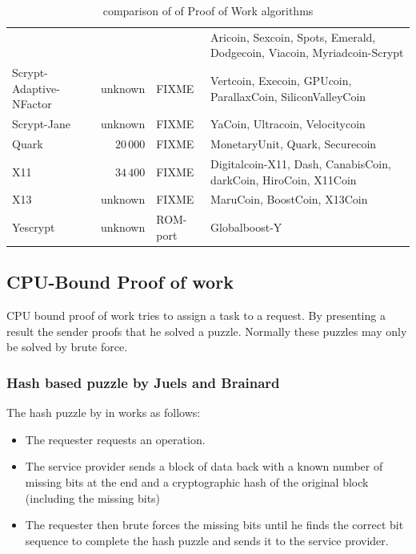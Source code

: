 \begin{table}[t]
\begin{tabular}{|l|r|l|l|}
		                                    &                   &                & Aricoin, Sexcoin, Spots, Emerald, Dodgecoin, Viacoin, Myriadcoin-Scrypt\\    
		Scrypt-Adaptive-NFactor             &           unknown & FIXME          & Vertcoin, Execoin, GPUcoin, ParallaxCoin, SiliconValleyCoin\\
		Scrypt-Jane                         &           unknown & FIXME          & YaCoin, Ultracoin, Velocitycoin\\
		Quark                               &        $20\, 000$ & FIXME          & MonetaryUnit, Quark, Securecoin\\
		X11                                 &        $34\, 400$	& FIXME          & Digitalcoin-X11, Dash, CanabisCoin, darkCoin, HiroCoin, X11Coin\\
		X13                                 &           unknown & FIXME          & MaruCoin, BoostCoin, X13Coin\\
		Yescrypt   \cite{yescrypt}          &           unknown & ROM-port       & Globalboost-Y \\
		\hline          
	\end{tabular}	
	\caption{comparison of of Proof of Work algorithms}
	\label{tab:hashSpeed}
\end{table}

\subsection{CPU-Bound Proof of work}
CPU bound proof of work tries to assign a task to a request. By presenting a result the sender proofs that he solved a puzzle. Normally these puzzles may only be solved by brute force.

\subsubsection{Hash based puzzle by Juels and Brainard} 
The hash puzzle by \citeauthor{juels1999client} in \cite{juels1999client} works as follows: 
\begin{itemize}
	\item The requester requests an operation.
	\item The service provider sends a block of data back with a known number of missing bits at the end and a cryptographic hash of the original block (including the missing bits)
	\item The requester then brute forces the missing bits until he finds the correct bit sequence to complete the hash puzzle and sends it to the service provider.
\end{itemize}

